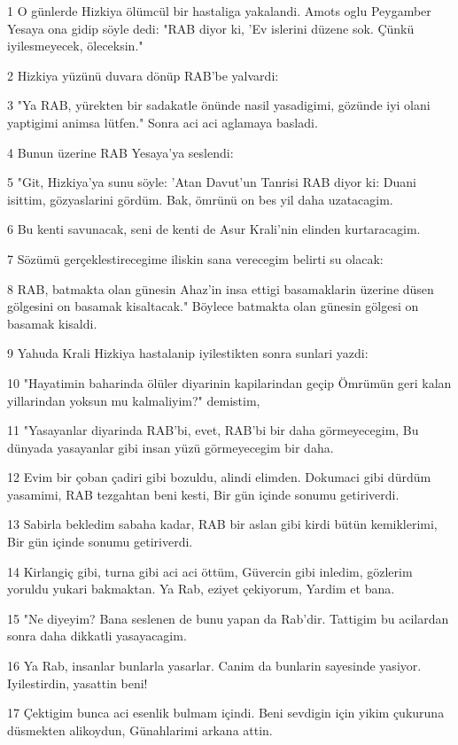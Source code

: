 \par 1 O günlerde Hizkiya ölümcül bir hastaliga yakalandi. Amots oglu Peygamber Yesaya ona gidip söyle dedi: "RAB diyor ki, 'Ev islerini düzene sok. Çünkü iyilesmeyecek, öleceksin."
\par 2 Hizkiya yüzünü duvara dönüp RAB'be yalvardi:
\par 3 "Ya RAB, yürekten bir sadakatle önünde nasil yasadigimi, gözünde iyi olani yaptigimi animsa lütfen." Sonra aci aci aglamaya basladi.
\par 4 Bunun üzerine RAB Yesaya'ya seslendi:
\par 5 "Git, Hizkiya'ya sunu söyle: 'Atan Davut'un Tanrisi RAB diyor ki: Duani isittim, gözyaslarini gördüm. Bak, ömrünü on bes yil daha uzatacagim.
\par 6 Bu kenti savunacak, seni de kenti de Asur Krali'nin elinden kurtaracagim.
\par 7 Sözümü gerçeklestirecegime iliskin sana verecegim belirti su olacak:
\par 8 RAB, batmakta olan günesin Ahaz'in insa ettigi basamaklarin üzerine düsen gölgesini on basamak kisaltacak." Böylece batmakta olan günesin gölgesi on basamak kisaldi.
\par 9 Yahuda Krali Hizkiya hastalanip iyilestikten sonra sunlari yazdi:
\par 10 "Hayatimin baharinda ölüler diyarinin kapilarindan geçip Ömrümün geri kalan yillarindan yoksun mu kalmaliyim?" demistim,
\par 11 "Yasayanlar diyarinda RAB'bi, evet, RAB'bi bir daha görmeyecegim, Bu dünyada yasayanlar gibi insan yüzü görmeyecegim bir daha.
\par 12 Evim bir çoban çadiri gibi bozuldu, alindi elimden. Dokumaci gibi dürdüm yasamimi, RAB tezgahtan beni kesti, Bir gün içinde sonumu getiriverdi.
\par 13 Sabirla bekledim sabaha kadar, RAB bir aslan gibi kirdi bütün kemiklerimi, Bir gün içinde sonumu getiriverdi.
\par 14 Kirlangiç gibi, turna gibi aci aci öttüm, Güvercin gibi inledim, gözlerim yoruldu yukari bakmaktan. Ya Rab, eziyet çekiyorum, Yardim et bana.
\par 15 "Ne diyeyim? Bana seslenen de bunu yapan da Rab'dir. Tattigim bu acilardan sonra daha dikkatli yasayacagim.
\par 16 Ya Rab, insanlar bunlarla yasarlar. Canim da bunlarin sayesinde yasiyor. Iyilestirdin, yasattin beni!
\par 17 Çektigim bunca aci esenlik bulmam içindi. Beni sevdigin için yikim çukuruna düsmekten alikoydun, Günahlarimi arkana attin.
